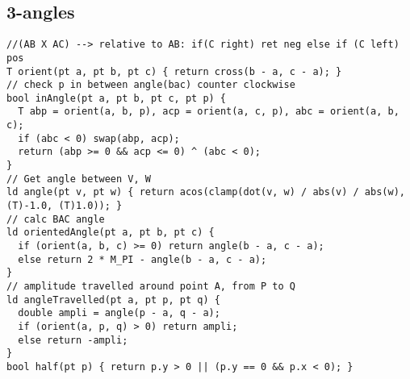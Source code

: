 \documentclass[twoside]{article}
\begin{document}
\begin{multicols*}{2}
{\subsection*{3-angles}
}
\begin{verbatim}
//(AB X AC) --> relative to AB: if(C right) ret neg else if (C left) pos
T orient(pt a, pt b, pt c) { return cross(b - a, c - a); }
// check p in between angle(bac) counter clockwise
bool inAngle(pt a, pt b, pt c, pt p) {
  T abp = orient(a, b, p), acp = orient(a, c, p), abc = orient(a, b, c);
  if (abc < 0) swap(abp, acp);
  return (abp >= 0 && acp <= 0) ^ (abc < 0);
}
// Get angle between V, W
ld angle(pt v, pt w) { return acos(clamp(dot(v, w) / abs(v) / abs(w), (T)-1.0, (T)1.0)); }
// calc BAC angle
ld orientedAngle(pt a, pt b, pt c) {
  if (orient(a, b, c) >= 0) return angle(b - a, c - a);
  else return 2 * M_PI - angle(b - a, c - a);
}
// amplitude travelled around point A, from P to Q
ld angleTravelled(pt a, pt p, pt q) {
  double ampli = angle(p - a, q - a);
  if (orient(a, p, q) > 0) return ampli;
  else return -ampli;
}
bool half(pt p) { return p.y > 0 || (p.y == 0 && p.x < 0); }

\end{verbatim}

{
}
\end{multicols*}
\end{document}
